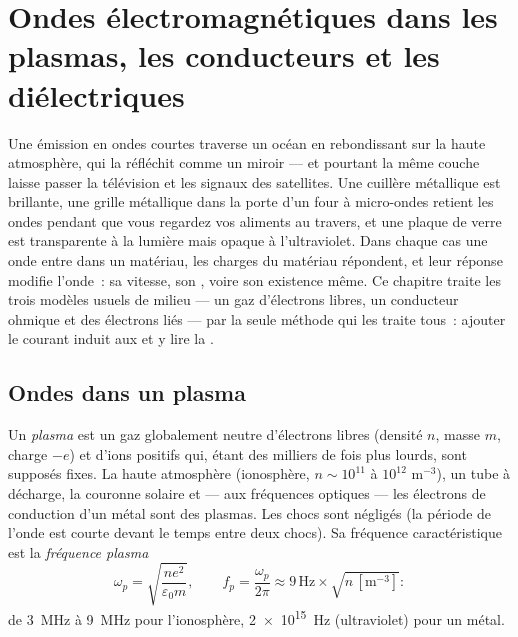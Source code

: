 \chapter{Ondes électromagnétiques dans les plasmas, les conducteurs et les diélectriques}\label{ch:b2:waves-in-media}

Une émission en ondes courtes traverse un océan en rebondissant sur la haute
atmosphère, qui la réfléchit comme un miroir --- et pourtant la même couche laisse
passer la télévision et les signaux des satellites. Une cuillère métallique est brillante, une
grille métallique dans la porte d'un four à micro-ondes retient les ondes pendant
que vous regardez vos aliments au travers, et une plaque de verre est transparente
à la lumière mais opaque à l'ultraviolet. Dans chaque cas une onde entre dans un
matériau, les charges du matériau répondent, et leur réponse modifie
l'onde~: sa vitesse, son , voire son existence même.
Ce chapitre traite les trois modèles usuels de milieu --- un
gaz d'électrons libres, un conducteur ohmique et des électrons liés --- par
la seule méthode qui les traite tous~: ajouter le courant induit aux
 et y lire la .

\section{Ondes dans un plasma}

\begin{definition}\label{def:b2:waves-in-media:plasma}
Un \emph{plasma} est un gaz globalement neutre d'électrons libres (densité
$n$, masse $m$, charge $-e$) et d'ions positifs qui, étant des milliers de
fois plus lourds, sont supposés fixes. La haute atmosphère (ionosphère,
$n \sim 10^{11}$ à $10^{12}$ m$^{-3}$), un tube à décharge, la couronne solaire
et --- aux fréquences optiques --- les électrons de conduction d'un métal
sont des plasmas. Les chocs sont négligés (la période de l'onde est courte
devant le temps entre deux chocs). Sa fréquence caractéristique
est la \emph{fréquence plasma}
\[
\omega_p = \sqrt{\frac{ne^2}{\varepsilon_0m}} , \qquad
f_p = \frac{\omega_p}{2\pi} \approx 9\,\text{Hz}\times\sqrt{n\,[\text{m}^{-3}]} :
\]
de \qty{3}{MHz} à \qty{9}{MHz} pour l'ionosphère, \qty{2e15}{Hz} (ultraviolet) pour
un métal.
\end{definition}

